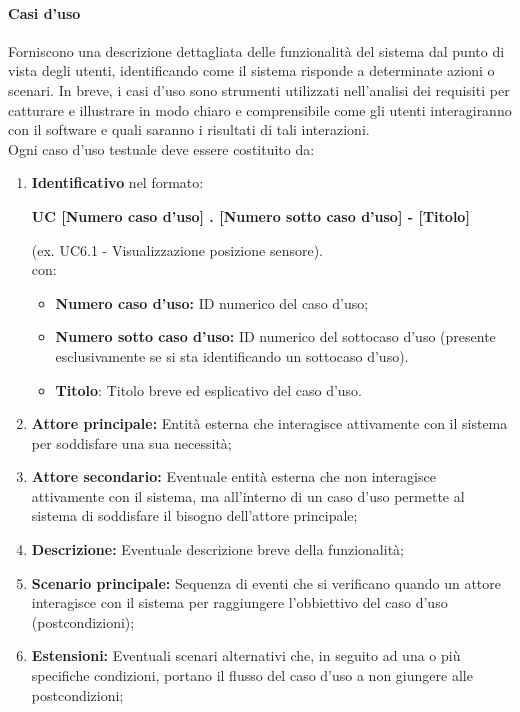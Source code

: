 \paragraph{Casi d'uso}
Forniscono una descrizione dettagliata delle funzionalità del sistema dal punto di vista degli utenti, identificando come il sistema risponde a determinate azioni o scenari. In breve, i casi d'uso sono strumenti utilizzati nell'analisi dei requisiti per catturare e illustrare in modo chiaro e comprensibile come gli utenti interagiranno con il software e quali saranno i risultati di tali interazioni. \\
Ogni caso d'uso testuale deve essere costituito da:
\begin{enumerate}
    \item \textbf{Identificativo} nel formato:\\
          \begin{center}
              \textbf{UC [Numero caso d'uso] . [Numero sotto caso d'uso] - [Titolo]}
          \end{center}
          (ex. UC6.1 - Visualizzazione posizione sensore).\\
          con:
          \begin{itemize}
              \item \textbf{Numero caso d'uso:} ID numerico del caso d'uso;
              \item \textbf{Numero sotto caso d'uso:} ID numerico del sottocaso d'uso (presente esclusivamente se si sta identificando un sottocaso d'uso).
              \item \textbf{Titolo}: Titolo breve ed esplicativo del caso d'uso.
          \end{itemize}
    \item \textbf{Attore principale:} Entità esterna che interagisce attivamente con il sistema per soddisfare una sua necessità;
    \item \textbf{Attore secondario:} Eventuale entità esterna che non interagisce attivamente con il sistema, ma all'interno di un caso d'uso permette al sistema di soddisfare il bisogno dell'attore principale;
    \item \textbf{Descrizione:} Eventuale descrizione breve della funzionalità;
    \item \textbf{Scenario principale:} Sequenza di eventi che si verificano quando un attore interagisce con il sistema per raggiungere l'obbiettivo del caso d'uso (postcondizioni);
    \item \textbf{Estensioni:} Eventuali scenari alternativi che, in seguito ad una o più specifiche condizioni, portano il flusso del caso d'uso a non giungere alle postcondizioni;

\end{enumerate}
